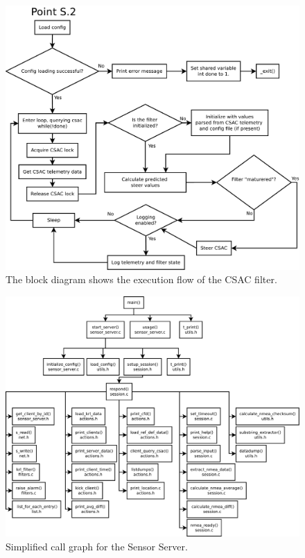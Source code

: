 \documentclass[12pt,english,a4paper]{report}
\begin{document}
\begin{figure}
\centering
  \includegraphics[angle=90, scale=0.40]{csac_filter.pdf}
   \caption[Socket Server execution flow block diagram]{The block diagram shows the execution flow of the CSAC filter.}
   \label{csac_filter}
\end{figure}

\begin{figure}
\centering
  \includegraphics[scale=0.3]{server_call_graph.pdf}
   \caption[Sensor Server simplified call graph]{Simplified call graph for the Sensor Server.}
   \label{server_call_graph}
\end{figure}
\end{document}

